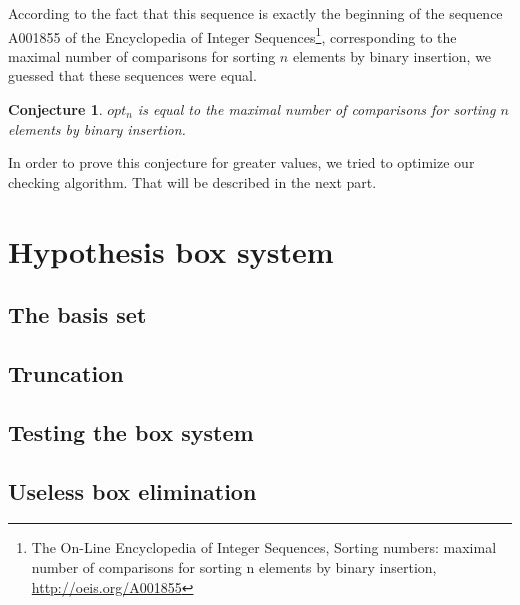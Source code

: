 \documentclass[11pt, a4paper]{article}
\newtheorem*{Conj*}{Conjecture}
\begin{document}
According to the fact that this sequence is exactly the beginning of the sequence A001855 of the Encyclopedia of Integer Sequences\footnote{The On-Line Encyclopedia of Integer Sequences, Sorting numbers: maximal number of comparisons for sorting n elements by binary insertion, \url{http://oeis.org/A001855}}, 
corresponding to the maximal number of comparisons for sorting $n$ elements by binary insertion, we guessed that these sequences were equal.

\Large
\begin{Conj*}
$opt_n$ is equal to the maximal number of comparisons for sorting $n$ elements by binary insertion.
\end{Conj*}
\normalsize

In order to prove this conjecture for greater values, we tried to optimize our checking algorithm. That will be described in the next part.

\section{Hypothesis box system}

\subsection{The basis set}

\subsection{Truncation}

\subsection{Testing the box system}

\subsection{Useless box elimination}
\end{document}
